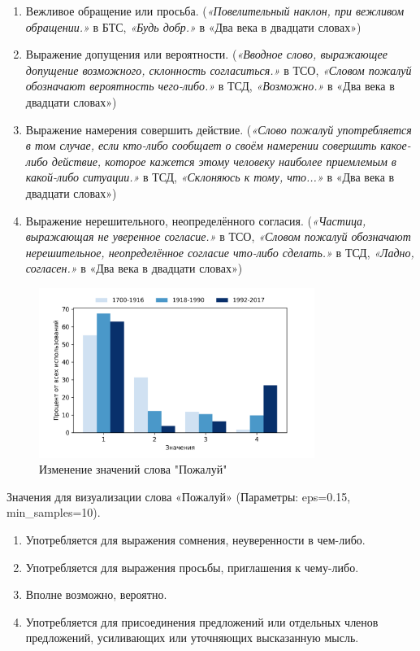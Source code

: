 \begin{enumerate}
    \item Вежливое обращение или просьба.
(\textit{«Повелительный наклон, при вежливом обращении.»} в БТС,
\textit{«Будь добр.»} в «Два века в двадцати словах»)
    \item Выражение допущения или вероятности.
(\textit{«Вводное слово, выражающее допущение возможного, склонность согласиться.»} в ТСО,
\textit{«Словом пожалуй обозначают вероятность чего-либо.»} в ТСД,
\textit{«Возможно.»} в «Два века в двадцати словах»)
    \item Выражение намерения совершить действие.
(\textit{«Слово пожалуй употребляется в том случае, если кто-либо сообщает о своём намерении
совершить какое-либо действие, которое кажется этому человеку наиболее приемлемым в какой-либо ситуации.»} в ТСД,
\textit{«Склоняюсь к тому, что...»} в «Два века в двадцати словах»)
    \item Выражение нерешительного, неопределённого согласия.
(\textit{«Частица, выражающая не уверенное согласие.»} в ТСО,
\textit{«Словом пожалуй обозначают нерешительное, неопределённое согласие что-либо сделать.»} в ТСД,
\textit{«Ладно, согласен.»} в «Два века в двадцати словах»)
\end{enumerate}

\begin{figure}[H]
	\centering
	\includegraphics[width=0.8\textwidth]{img/visualizations/pozhaluj_minimal}
	\caption{Изменение значений слова "Пожалуй"}
	\label{fig:Пожалуй}
\end{figure}

Значения для визуализации слова «Пожалуй» (Параметры: eps=0.15, min\_samples=10).

\begin{enumerate}
    \item Употребляется для выражения сомнения, неуверенности в чем-либо.
    \item Употребляется для выражения просьбы, приглашения к чему-либо.
    \item Вполне возможно, вероятно.
    \item Употребляется для присоединения предложений или отдельных членов предложений,
усиливающих или уточняющих высказанную мысль.
\end{enumerate}

